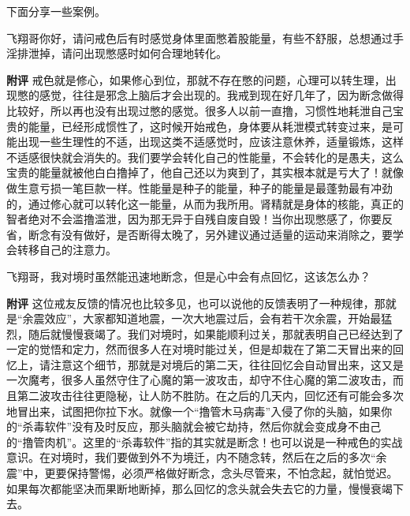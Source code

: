 下面分享一些案例。

\begin{case}
    飞翔哥你好，请问戒色后有时感觉身体里面憋着股能量，有些不舒服，总想通过手淫排泄掉，请问出现憋感时如何合理地转化。

    \textbf{附评} 戒色就是修心，如果修心到位，那就不存在憋的问题，心理可以转生理，出现憋的感觉，往往是邪念上脑后才会出现的。我戒到现在好几年了，因为断念做得比较好，所以再也没有出现过憋的感觉。很多人以前一直撸，习惯性地耗泄自己宝贵的能量，已经形成惯性了，这时候开始戒色，身体要从耗泄模式转变过来，是可能出现一些生理性的不适，出现这类不适感觉时，应该注意休养，适量锻炼，这样不适感很快就会消失的。我们要学会转化自己的性能量，不会转化的是愚夫，这么宝贵的能量就被他白白撸掉了，他自己还以为爽到了，其实根本就是亏大了！就像做生意亏损一笔巨款一样。性能量是种子的能量，种子的能量是最蓬勃最有冲劲的，通过修心就可以转化这一能量，从而为我所用。肾精就是身体的核能，真正的智者绝对不会滥撸滥泄，因为那无异于自残自废自毁！当你出现憋感了，你要反省，断念有没有做好，是否断得太晚了，另外建议通过适量的运动来消除之，要学会转移自己的注意力。
\end{case}

\begin{case}
    飞翔哥，我对境时虽然能迅速地断念，但是心中会有点回忆，这该怎么办？

    \textbf{附评} 这位戒友反馈的情况也比较多见，也可以说他的反馈表明了一种规律，那就是“余震效应”，大家都知道地震，一次大地震过后，会有若干次余震，开始最猛烈，随后就慢慢衰竭了。我们对境时，如果能顺利过关，那就表明自己已经达到了一定的觉悟和定力，然而很多人在对境时能过关，但是却栽在了第二天冒出来的回忆上，请注意这个细节，那就是对境后的第二天，往往回忆会自动冒出来，这又是一次魔考，很多人虽然守住了心魔的第一波攻击，却守不住心魔的第二波攻击，而且第二波攻击往往更隐秘，让人防不胜防。在之后的几天内，回忆还有可能会多次地冒出来，试图把你拉下水。就像一个“撸管木马病毒”入侵了你的头脑，如果你的“杀毒软件”没有及时反应，那头脑就会被它劫持，然后你就会变成身不由己的“撸管肉机”。这里的“杀毒软件”指的其实就是断念！也可以说是一种戒色的实战意识。在对境时，我们要做到外不为境迁，内不随念转，然后在之后的多次“余震”中，更要保持警惕，必须严格做好断念，念头尽管来，不怕念起，就怕觉迟。如果每次都能坚决而果断地断掉，那么回忆的念头就会失去它的力量，慢慢衰竭下去。
\end{case}

